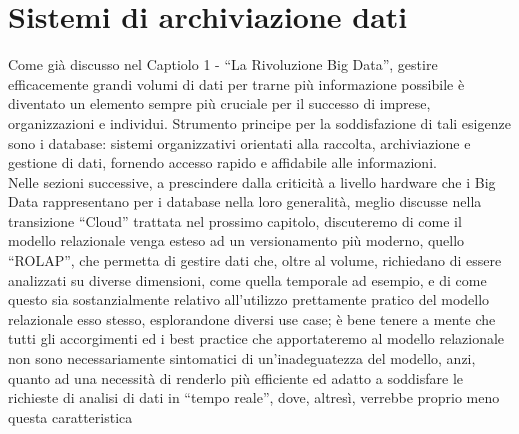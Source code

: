 \documentclass[a4paper,12pt]{report}
\begin{document}
\chapter{Sistemi di archiviazione dati}
\thispagestyle{empty} %
\fancyhead{} %
\fancyhead[R]{\thepage} %
Come già discusso nel Captiolo 1 - “La Rivoluzione Big Data”, gestire efficacemente grandi volumi di dati per trarne più informazione possibile è diventato un elemento sempre più cruciale per il successo di imprese, organizzazioni e individui. Strumento principe per la soddisfazione di tali esigenze sono i database: sistemi organizzativi orientati alla raccolta, archiviazione e gestione di dati, fornendo accesso rapido e affidabile alle informazioni.
\\[0ex]
Nelle sezioni successive, a prescindere dalla criticità a livello hardware che i Big Data rappresentano per i database nella loro generalità, meglio discusse nella transizione “Cloud” trattata nel prossimo capitolo, discuteremo di come il modello relazionale venga esteso ad un versionamento più moderno, quello “ROLAP”, che permetta di gestire dati che, oltre al volume, richiedano di essere analizzati su diverse dimensioni, come quella temporale ad esempio, e di come questo sia sostanzialmente relativo all’utilizzo prettamente pratico del modello relazionale esso stesso, esplorandone diversi use case; è bene tenere a mente che tutti gli accorgimenti ed i best practice che apportateremo al modello relazionale non sono necessariamente sintomatici di un’inadeguatezza del modello, anzi, quanto ad una necessità di renderlo più efficiente ed adatto a soddisfare le richieste di analisi di dati in “tempo reale”, dove, altresì, verrebbe proprio meno questa caratteristica
\end{document}
